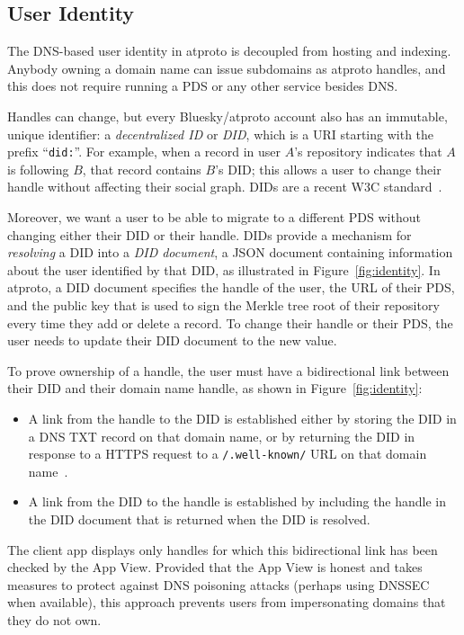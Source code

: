 \documentclass[sigconf]{acmart}
\begin{document}
\subsection{User Identity}\label{sec:identity}

The DNS-based user identity in atproto is decoupled from hosting and indexing.
Anybody owning a domain name can issue subdomains as atproto handles, and this does not require running a PDS or any other service besides DNS.

Handles can change, but every Bluesky/atproto account also has an immutable, unique identifier: a \emph{decentralized ID} or \emph{DID}, which is a URI starting with the prefix ``\texttt{did:}''.
For example, when a record in user $A$'s repository indicates that $A$ is following $B$, that record contains $B$'s DID; this allows a user to change their handle without affecting their social graph.
DIDs are a recent W3C standard~\cite{DIDCore}.

Moreover, we want a user to be able to migrate to a different PDS without changing either their DID or their handle.
DIDs provide a mechanism for \emph{resolving} a DID into a \emph{DID document}, a JSON document containing information about the user identified by that DID, as illustrated in Figure~\ref{fig:identity}.
In atproto, a DID document specifies the handle of the user, the URL of their PDS, and the public key that is used to sign the Merkle tree root of their repository every time they add or delete a record.
To change their handle or their PDS, the user needs to update their DID document to the new value.

To prove ownership of a handle, the user must have a bidirectional link between their DID and their domain name handle, as shown in Figure~\ref{fig:identity}:
\begin{itemize}
    \item A link from the handle to the DID is established either by storing the DID in a DNS TXT record on that domain name, or by returning the DID in response to a HTTPS request to a \texttt{/.well-known/} URL on that domain name~\cite{DomainHandle}.
    \item A link from the DID to the handle is established by including the handle in the DID document that is returned when the DID is resolved.
\end{itemize}
The client app displays only handles for which this bidirectional link has been checked by the App View.
Provided that the App View is honest and takes measures to protect against DNS poisoning attacks (perhaps using DNSSEC when available), this approach prevents users from impersonating domains that they do not own.
\end{document}

